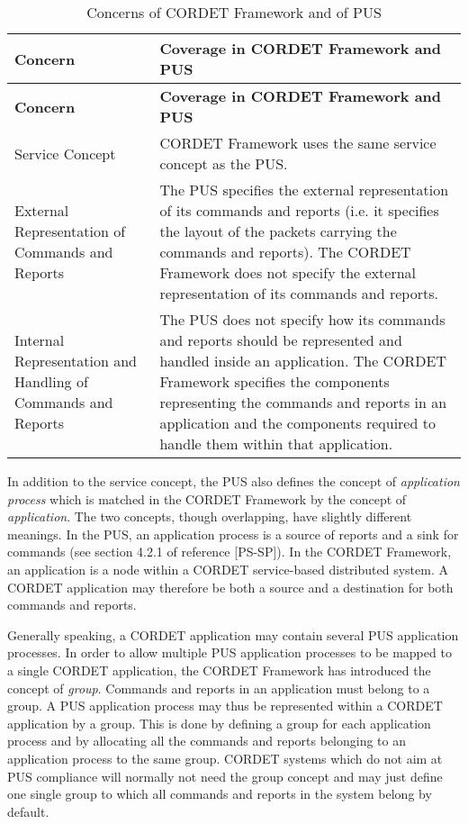 \begin{longtable}{|>{\raggedright\arraybackslash}p{3cm}|p{10cm}|}
\caption{Concerns of CORDET Framework and of PUS}\label{tab:PusCrConcerns} \\
\hline
\rowcolor{light-gray}
\textbf{Concern} & \textbf{Coverage in CORDET Framework and PUS}\\
\hline\hline
\endfirsthead
\rowcolor{light-gray}
\textbf{Concern} & \textbf{Coverage in CORDET Framework and PUS}\\
\hline\hline
\endhead
Service Concept & CORDET Framework uses the same service concept as the PUS.\\
\hline
External Representation of Commands and Reports & The PUS specifies the external representation of its commands and reports (i.e. it specifies the layout of the packets carrying the commands and reports). The CORDET Framework does not specify the external representation of its commands and reports.\\
\hline
Internal Representation and Handling of Commands and Reports & The PUS does not specify how its commands and reports should be represented and handled inside an application. The CORDET Framework specifies the components representing the commands and reports in an application and the components required to handle them within that application.\\
\hline
\end{longtable}

In addition to the service concept, the PUS also defines the concept of \textit{application process} which is matched in the CORDET Framework by the concept of \textit{application}. The two concepts, though overlapping, have slightly different meanings. In the PUS, an application process is a source of reports and a sink for commands (see section 4.2.1 of reference [PS-SP]). In the CORDET Framework, an application is a node within a CORDET service-based distributed system. A CORDET application may therefore be both a source and a destination for both commands and reports. 

Generally speaking, a CORDET application may contain several PUS application processes. In order to allow multiple PUS application processes to be mapped to a single CORDET application, the CORDET Framework has introduced the concept of \textit{group}. Commands and reports in an application must belong to a group. A PUS application process may thus be represented within a CORDET application by a group. This is done by defining a group for each application process and by allocating all the commands and reports belonging to an application process to the same group. CORDET systems which do not aim at PUS compliance will normally not need the group concept and may just define one single group to which all commands and reports in the system belong by default.